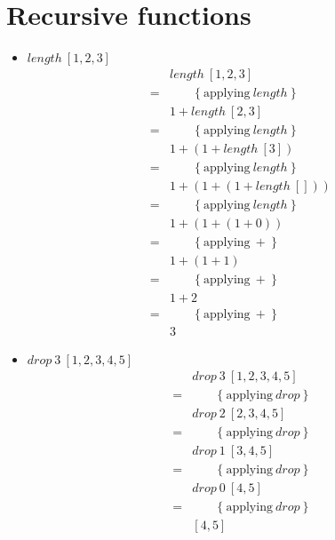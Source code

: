 \chapter{\Large{Recursive functions}}


\begin{itemize}
\item $length~[1,2,3]$
  \begin{align*}
      & length~[1,2,3] \\
    = & \qquad \{~ \text{applying}~length ~\} \\
      & 1 + length~[2,3] \\
    = & \qquad \{~ \text{applying}~length ~\} \\
      & 1 + (1 + length~[3]) \\
    = & \qquad \{~ \text{applying}~length ~\} \\
      & 1 + (1 + (1 + length~[])) \\
    = & \qquad \{~ \text{applying}~length ~\} \\
      & 1 + (1 + (1 + 0)) \\
    = & \qquad \{~ \text{applying}~+ ~\} \\
      & 1 + (1 + 1) \\
    = & \qquad \{~ \text{applying}~+ ~\} \\
      & 1 + 2 \\
    = & \qquad \{~ \text{applying}~+ ~\} \\
      & 3
  \end{align*}
\item $drop~3~[1,2,3,4,5]$
  \begin{align*}
      & drop~3~[1,2,3,4,5] \\
    = & \qquad \{~ \text{applying}~drop ~\} \\
      & drop~2~[2,3,4,5] \\
    = & \qquad \{~ \text{applying}~drop ~\} \\
      & drop~1~[3,4,5] \\
    = & \qquad \{~ \text{applying}~drop ~\} \\
      & drop~0~[4,5] \\
    = & \qquad \{~ \text{applying}~drop ~\} \\
      & [4,5]
  \end{align*}

\end{itemize}
